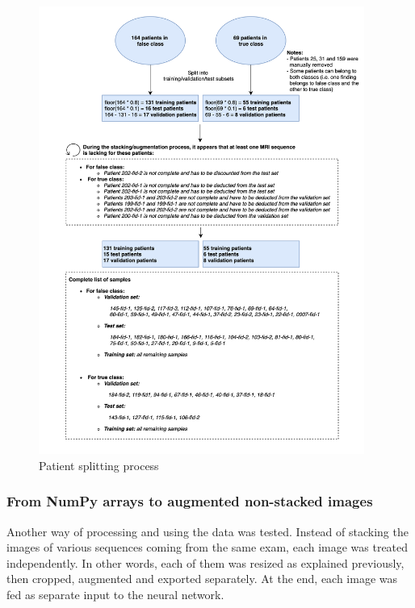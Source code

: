 \begin{figure}[!h]
\centering
\includegraphics[width=0.95\textwidth, keepaspectratio=true]{./figures/paper_reproduction_split.png}
\caption{Patient splitting process}
\label{fig:paper_reproduction_split}
\end{figure}


\subsubsection{From NumPy arrays to augmented non-stacked images}
\setlength{\marginparwidth}{3cm}\leavevmode {}Another way of processing and using the data was tested. Instead of stacking the images of various sequences coming from the same exam, each image was treated independently. In other words, each of them was resized as explained previously, then cropped, augmented and exported separately. At the end, each image was fed as separate input to the neural network.

